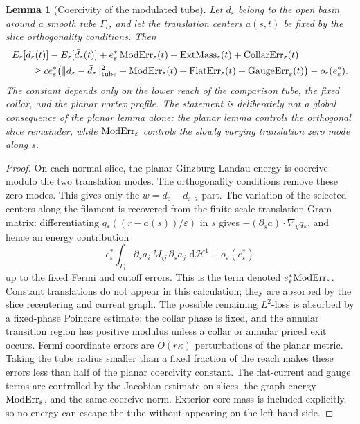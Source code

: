 \documentclass[11pt]{article}
\newtheorem{lemma}[theorem]{Lemma}
\theoremstyle{definition}
\newcommand{\dd}{\,\mathrm d}
\newcommand{\eps}{\varepsilon}
\newcommand{\estar}{e_\varepsilon^\ast}
\newcommand{\Hh}{\mathcal H}
\begin{document}
\begin{lemma}[Coercivity of the modulated tube]
\label{lem:short-tube-coercivity}
Let \(d_\eps\) belong to the open basin around a smooth tube \(\Gamma_t\), and
let the translation centers \(a(s,t)\) be fixed by the slice orthogonality
conditions.  Then
\[
\begin{aligned}
&E_\eps[d_\eps(t)]-E_\eps[\bar d_\eps(t)]
        +
        \estar\,{\rm ModErr}_\eps(t)
        +
        {\rm ExtMass}_\eps(t)
        +
        {\rm CollarErr}_\eps(t)
\\
&\qquad\ge
        c\estar
        \bigl(
        \|d_\eps-\bar d_\eps\|_{\rm tube}^2
        +
        {\rm ModErr}_\eps(t)
        +
        {\rm FlatErr}_\eps(t)
        +
        {\rm GaugeErr}_\eps(t)
        \bigr)
        -
        o_\eps(\estar).
\end{aligned}
\]
The constant depends only on the lower reach of the comparison tube, the fixed
collar, and the planar vortex profile.  The statement is deliberately not a
global consequence of the planar lemma alone: the planar lemma controls the
orthogonal slice remainder, while \({\rm ModErr}_\eps\) controls the slowly
varying translation zero mode along \(s\).
\end{lemma}

\begin{proof}
On each normal slice, the planar Ginzburg-Landau energy is coercive modulo the
two translation modes.  The orthogonality conditions remove these zero modes.
This gives only the \(w=d_\eps-\bar d_{\eps,a}\) part.  The variation of the
selected centers along the filament is recovered from the finite-scale
translation Gram matrix: differentiating
\(q_\ast((r-a(s))/\eps)\) in \(s\) gives
\(-(\partial_s a)\cdot\nabla_yq_\ast\), and hence an energy contribution
\[
        \estar
        \int_{\Gamma_t}
        \partial_s a_i\,M_{ij}\,\partial_s a_j\,\dd\Hh^1
        +
        o_\eps(\estar)
\]
up to the fixed Fermi and cutoff errors.  This is the term denoted
\(\estar{\rm ModErr}_\eps\).  Constant translations do not appear in this
calculation; they are absorbed by the slice recentering and current graph.
The possible remaining \(L^2\)-loss is absorbed by a fixed-phase Poincare
estimate: the collar phase is fixed, and the annular transition region has
positive modulus unless a collar or annular priced exit occurs.  Fermi
coordinate errors are \(O(r\kappa)\) perturbations of the planar metric.  Taking
the tube radius smaller than a fixed fraction of the reach makes these errors
less than half of the planar coercivity constant.  The flat-current and gauge
terms are controlled by the Jacobian estimate on slices, the graph energy
\({\rm ModErr}_\eps\), and the same coercive norm.  Exterior core mass is
included explicitly, so no energy can escape the tube without appearing on the
left-hand side.
\end{proof}
\end{document}

